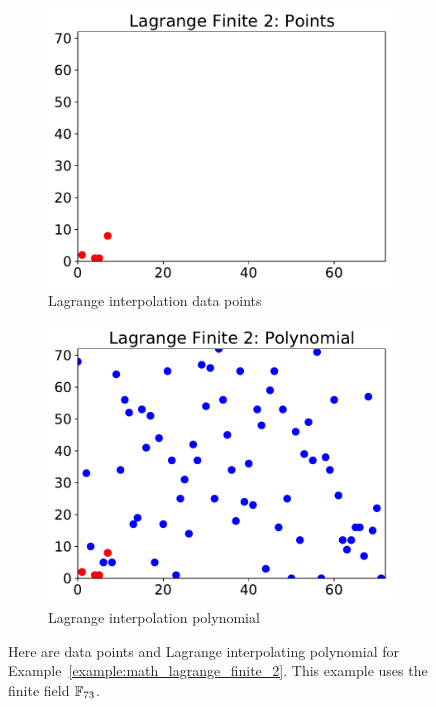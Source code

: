 \begin{figure}[t]
\centering
    \begin{subfigure}[t]{0.45\textwidth}
    \includegraphics[width=\textwidth]{plots/lagrange/lagrange_finite_points_2.pdf}
    \caption{Lagrange interpolation data points}
    \label{fig:lagrange_finite_points_2}
    \end{subfigure}
    \begin{subfigure}[t]{0.45\textwidth}
    \includegraphics[width=\textwidth]{plots/lagrange/lagrange_finite_poly_2.pdf}
    \caption{Lagrange interpolation polynomial}
    \label{fig:lagrange_finite_poly_2}
    \end{subfigure}
    \caption[Data points and Lagrange Interpolation over finite fields 2]{Here
        are data points and Lagrange interpolating polynomial
        for Example~\ref{example:math_lagrange_finite_2}.
        This example uses the \gls{finite field} $\mathbb{F}_{73}$.}
\end{figure}

